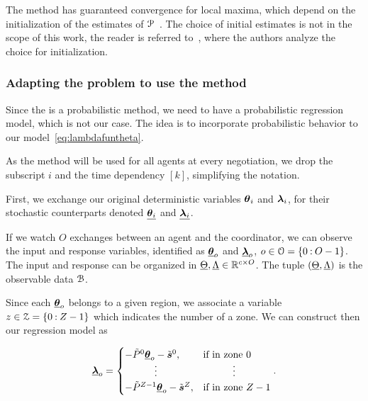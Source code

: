 \documentclass[../main.tex]{subfiles}
\begin{document}
\begin{remark}\label{rem:em_depends_on_initialization}
  The method has guaranteed convergence for local maxima, which depend on the initialization of the estimates of $\mathcal{P}$~\cite{BaudryCeleux2015,GepperthPfuelb2021}.
  The choice of initial estimates is not in the scope of this work, the reader is referred to~\cite{KarlisXekalaki2003,BaudryCeleux2015}, where the authors analyze the choice for initialization.
\end{remark}

\subsubsection{Adapting the problem to use the method}
Since the \EM{} is a probabilistic method, we need to have a probabilistic regression model, which is not our case.
The idea is to incorporate probabilistic behavior to our model~\eqref{eq:lambdafuntheta}.

As the method will be used for all agents at every negotiation, we drop the subscript $i$ and the time dependency $[k]$, simplifying the notation.

First, we exchange our original deterministic variables $\boldsymbol{\theta}_i$ and $\boldsymbol{\lambda}_i$, for their stochastic counterparts denoted $\underline{\boldsymbol{\theta}_i}$ and $\underline{\boldsymbol{\lambda}_i}$.

If we watch $O$ exchanges between an agent and the coordinator, we can observe the input and response variables, identified as ${\underline{\boldsymbol{\theta}}_{o}}$ and ${\underline{\boldsymbol{\lambda}}_{o}}$, ${o\in\mathcal{O}=\{0\mathbin{:} O-1\}}$.
The input and response can be organized in ${\underline{\Theta},\underline{\Lambda}\in\mathbb{R}^{c\times O}}$.
The tuple ${(\underline{\Theta},\underline{\Lambda})}$ is the observable data $\mathcal{B}$.

Since each ${\underline{\boldsymbol{\theta}}}_{o}$ belongs to a given region, we associate a variable $z\in\mathcal{Z}=\{0\mathbin{:} Z-1\}$ which indicates the number of a zone.
We can construct then our regression model as

\begin{equation}\label{eq:linear_cheating_random}
  \randomvec{\lambda}_{o}=
  \begin{cases}
    -\tilde{P}^{0}\randomvec{\theta}_{o}-\tilde{\vec{s}}^{0},&\text{if in zone } 0\\
    \qquad\quad \vdots&\qquad\quad \vdots\\
    -\tilde{P}^{Z-1}\randomvec{\theta}_{o}-\tilde{\vec{s}}^{Z},&\text{if in zone } Z-1\\
  \end{cases}.
\end{equation}
\end{document}
